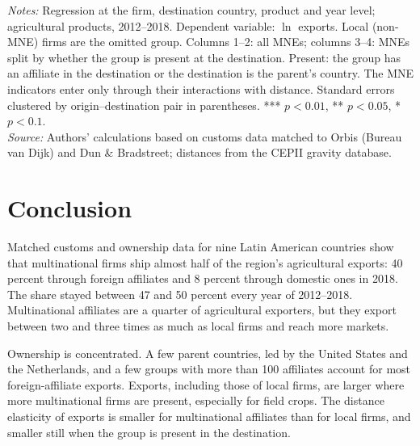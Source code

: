 \begin{table}[htbp]
\centering
\caption{Distance and firm agricultural exports: multinationals by presence at the destination}
\label{tab:t2}
{\footnotesize\setlength{\tabcolsep}{4pt}\setlength{\extrarowheight}{1pt}
}

\begin{minipage}{0.95\linewidth}
\notesize
\vspace{0.6em}
\textit{Notes:} Regression at the firm, destination country, product and year level; agricultural products, 2012--2018. Dependent variable: $\ln$ exports. Local (non-MNE) firms are the omitted group. Columns 1--2: all MNEs; columns 3--4: MNEs split by whether the group is present at the destination. Present: the group has an affiliate in the destination or the destination is the parent's country. The MNE indicators enter only through their interactions with distance. Standard errors clustered by origin--destination pair in parentheses. *** $p<0.01$, ** $p<0.05$, * $p<0.1$.\\
\textit{Source:} Authors' calculations based on customs data matched to Orbis (Bureau van Dijk) and Dun \& Bradstreet; distances from the CEPII gravity database.
\end{minipage}
\end{table}

\section{Conclusion}\label{sec:concl}
Matched customs and ownership data for nine Latin American countries show that multinational firms ship almost
half of the region's agricultural exports: 40 percent through foreign affiliates and 8 percent through domestic ones
in 2018. The share stayed between 47 and 50 percent every year of 2012--2018. Multinational affiliates are a quarter of agricultural
exporters, but they export between two and three times as much as local firms and reach more markets.

Ownership is concentrated. A few parent countries, led by the United States and the Netherlands, and a few
groups with more than 100 affiliates account for most foreign-affiliate exports. Exports, including those
of local firms, are larger where more multinational firms are present, especially for field crops. The distance elasticity of exports is smaller for multinational affiliates than for local firms, and smaller still when the group is present in the destination.

